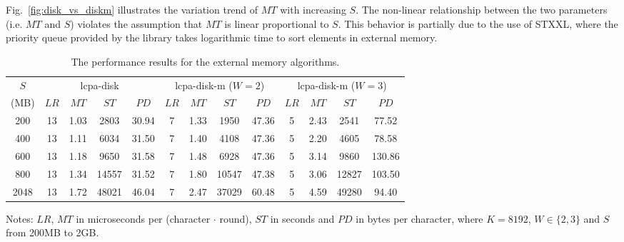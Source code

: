 \documentclass{llncs}
\begin{document}
Fig.~\ref{fig:disk_vs_diskm} illustrates the variation trend of $MT$ with increasing $S$. The non-linear relationship between the two parameters (i.e. $MT$ and $S$) violates the assumption that $MT$ is linear proportional to $S$. This behavior is partially due to the use of STXXL, where the priority queue provided by the library takes logarithmic time to sort elements in external memory.

\begin{table}[htbp!]
	\begin{threeparttable}
		\caption{The performance results for the external memory algorithms.}
		\label{tbl:disk_vs_diskm}
		\centering
		\begin{tabular}{|c|c|c|c|c|c|c|c|c|c|c|c|c|}
			\hline
			$S$ & \multicolumn{4}{c|}{lcpa-disk} & \multicolumn{4}{c|}{lcpa-disk-m ($W = 2$)} & \multicolumn{4}{c|}{lcpa-disk-m ($W = 3$)}\\
			\cline{2-13}
			(MB) & $LR$ & $MT$ & $ST$ & $PD$ & $LR$ & $MT$ & $ST$ & $PD$ & $LR$ & $MT$ & $ST$ & $PD$\\
			\hline
			200 & 13 & 1.03 & 2803 & 30.94 & 7 & 1.33 & 1950 & 47.36 & 5 & 2.43 & 2541 & 77.52\\
			\hline
			400 & 13 & 1.11 & 6034 & 31.50 & 7 & 1.40 & 4108 & 47.36 & 5 & 2.20 & 4605 & 78.58\\
			\hline
			600 & 13 & 1.18 & 9650 & 31.58 & 7 & 1.48 & 6928 & 47.36 & 5 & 3.14 & 9860 & 130.86\\
			\hline
			800 & 13 & 1.34 & 14557 & 31.52 & 7 & 1.80 & 10547 & 47.38 & 5 & 3.06 & 12827 & 103.50\\
			\hline
			2048 & 13 & 1.72 & 48021 & 46.04 & 7 & 2.47 & 37029 & 60.48 & 5 & 4.59 & 49280 & 94.40\\
			\hline
		\end{tabular}
		\begin{tablenotes}
			\item Notes: $LR$, $MT$ in microseconds per (character $\cdot$ round), $ST$ in seconds and $PD$ in bytes per character, where $K=8192$, $W \in \{2,3\}$ and $S$ from 200MB to 2GB.
		\end{tablenotes}
	\end{threeparttable}
	\centering
\end{table}
\end{document}
